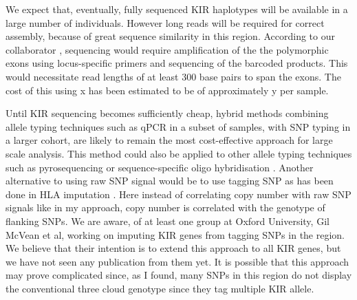 We expect that, eventually, fully sequenced KIR haplotypes will be available in a large number of individuals.
However long reads will be required for correct assembly, because of great sequence similarity in this region.
According to our collaborator , sequencing would require amplification of the the polymorphic exons
using locus-specific primers and sequencing of the barcoded products.
This would necessitate read lengths of at least 300 base pairs to span the exons.
The cost of this using x has been estimated to be of approximately \textsterling y per sample.


Until KIR sequencing becomes sufficiently cheap, hybrid methods combining allele typing techniques such as qPCR
in a subset of samples, with SNP typing in a larger cohort, are likely to remain the most cost-effective approach for large scale analysis.  
This method could also be applied to other allele typing techniques such as pyrosequencing \citep{Norman:2009fi} or sequence-specific oligo hybridisation \citep{Martin:2007ik}.
Another alternative to using raw SNP signal would be to use tagging SNP as has been done in HLA imputation \citep{Leslie:2008dq,Dilthey:2013dn}.
Here instead of correlating copy number with raw SNP signals like in my approach, copy number is correlated with the genotype of flanking SNPs.
We are aware, of at least one group at Oxford University, Gil McVean et al, working on imputing KIR genes from tagging SNPs in the region.  
We believe that their intention is to extend this approach to all KIR genes, but we have not seen any publication from them yet.
It is possible that this approach may prove complicated since, as I found, many SNPs in this region do not display the conventional three cloud genotype since
they tag multiple KIR allele.


